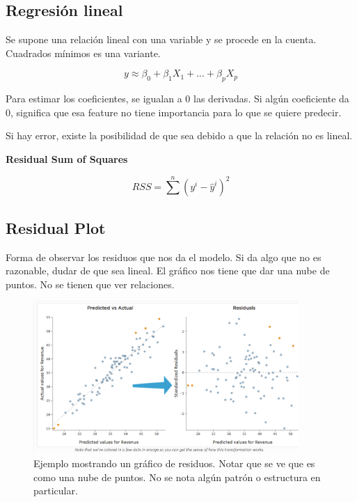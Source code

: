\documentclass[titlepage,a4paper]{article}
\begin{document}
\subsection{Regresión lineal}
Se supone una relación lineal con una variable y se procede en la cuenta. Cuadrados mínimos es una variante.

\begin{equation}
    y \approx \beta_0 + \beta_1 X_1 + ... + \beta_p X_p
\end{equation}

Para estimar los coeficientes, se igualan a 0 las derivadas. Si algún coeficiente da 0, significa que esa feature no tiene importancia para lo que se quiere predecir.

Si hay error, existe la posibilidad de que sea debido a que la relación no es lineal.

\textbf{Residual Sum of Squares}

\begin{equation}
    RSS = \sum^{n} (y^{i}-\hat{y}^{i})^{2}
\end{equation}


\subsection{Residual Plot}

Forma de observar los residuos que nos da el modelo. Si da algo que no es razonable, dudar de que sea lineal. El gráfico nos tiene que dar una nube de puntos. No se tienen que ver relaciones.

\begin{figure}[!htb]
    \centering
    \includegraphics[width=0.9\textwidth]{imagenesResumen/ResidualPlot.png}
    \caption{Ejemplo mostrando un gráfico de residuos. Notar que se ve que es como una nube de puntos. No se nota algún patrón o estructura en particular.}
\end{figure}
\end{document}
